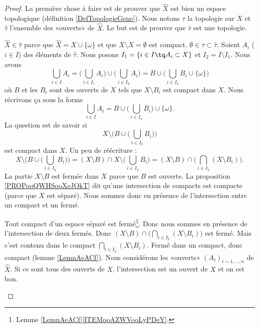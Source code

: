 \begin{proof}
	La première chose à faire est de prouver que \( \hat X\) est bien un espace topologique (définition \ref{DefTopologieGene}). Nous notons \( \tau\) la topologie sur \( X\) et \( \hat\tau\) l'ensemble des «ouverts» de \( \hat X\). Le but est de prouver que \( \hat \tau\) est une topologie.
	\begin{subproof}
		\( \hat X\in \hat\tau\) parce que \( \hat X=X\cup \{ \omega \}\) et que \( X\setminus X=\emptyset\) est compact.
		\spitem[Le vide]
		\( \emptyset\in \tau\subset \hat \tau\).
		Soient \( A_i\) (\( i\in I\)) des éléments de \( \hat\tau\). Nous posons \( I_1=\{ i\in I\tq A_i\subset X \}\) et \( I_2=I\setminus I_1\). Nous avons
		\begin{equation}
			\bigcup_{i\in I}A_i=\big( \bigcup_{i\in I_1}A_i \big)\cup \big( \bigcup_{i\in I_2}A_i \big)=B\cup\big( \bigcup_{i\in I_2}B_i\cup\{ \omega \} \big)
		\end{equation}
		où \( B\) et les \( B_i\) sont des ouverts de \( X\) tels que \( X\setminus B_i\) est compact dans \( X\). Nous récrivons ça sous la forme
		\begin{equation}
			\bigcup_{i\in I}A_i=B\cup\big( \bigcup_{i\in I_2}B_i \big)\cup\{ \omega \}.
		\end{equation}
		La question est de savoir si
		\begin{equation}
			X\setminus\Big( B\cup\big( \bigcup_{i\in I_2}B_i \big) \Big)
		\end{equation}
		est compact dans \( X\). Un peu de réécriture :
		\begin{equation}
			X\setminus\Big( B\cup\big( \bigcup_{i\in I_2}B_i \big) \Big)=(X\setminus B)\cap X\setminus\big( \bigcup_{i\in I_2}B_i \big)=(X\setminus B)\cap\big( \bigcap_{i\in I_2}(X\setminus B_i) \big).
		\end{equation}
		La partie \( X\setminus B\) est fermée dans \( X\) parce que \( B\) est ouverte. La proposition \ref{PROPooQWHSooXeJOkT} dit qu'une intersection de compacts est compacte (parce que \( X\) est séparé). Nous sommes donc en présence de l'intersection entre un compact et un fermé.

		Tout compact d'un espace séparé est fermé\footnote{Lemme \ref{LemnAeACf}\ref{ITEMooAZWVooLyPDeY}.}. Donc nous sommes en présence de l'intersection de deux fermés. Donc
		\( (X\setminus B)\cap\big( \bigcap_{i\in I_2}(X\setminus B_i) \big)\) est fermé. Mais c'est contenu dans le compact \( \bigcap_{i\in I_2}(X\setminus B_i)\). Fermé dans un compact, donc compact (lemme \ref{LemnAeACf}).
		Nous considérons les «ouverts» \( (A_i)_{i=1,\ldots, n}\) de \( \hat X\). Si ce sont tous des ouverts de \( X\), l'intersection est un ouvert de \( X\) et on est bon.


\end{subproof}
\end{proof}
